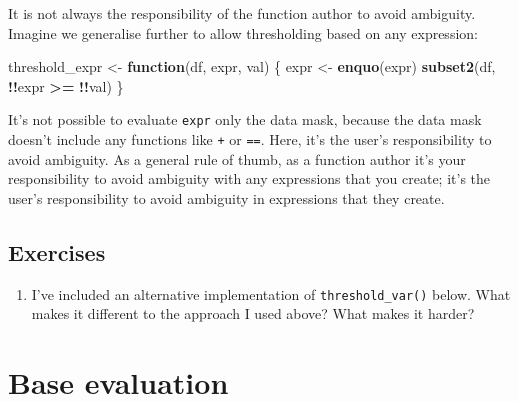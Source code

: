 \documentclass[]{book}
\newenvironment{Shaded}{\begin{snugshade}}{\end{snugshade}}
\newcommand{\ControlFlowTok}[1]{\textcolor[rgb]{0.27,0.27,0.27}{\textbf{#1}}}
\newcommand{\DataTypeTok}[1]{\textcolor[rgb]{0.27,0.27,0.27}{#1}}
\newcommand{\KeywordTok}[1]{\textcolor[rgb]{0.27,0.27,0.27}{\textbf{#1}}}
\newcommand{\NormalTok}[1]{#1}
\newcommand{\OperatorTok}[1]{\textcolor[rgb]{0.43,0.43,0.43}{\textbf{#1}}}
\newcommand{\StringTok}[1]{\textcolor[rgb]{0.5,0.5,0.5}{#1}}
\begin{document}
It is not always the responsibility of the function author to avoid ambiguity. Imagine we generalise further to allow thresholding based on any expression:

\begin{Shaded}
\begin{Highlighting}[]
\NormalTok{threshold_expr <-}\StringTok{ }\ControlFlowTok{function}\NormalTok{(df, expr, val) \{}
\NormalTok{  expr <-}\StringTok{ }\KeywordTok{enquo}\NormalTok{(expr)}
  \KeywordTok{subset2}\NormalTok{(df, }\OperatorTok{!!}\NormalTok{expr }\OperatorTok{>=}\StringTok{ }\OperatorTok{!!}\NormalTok{val)}
\NormalTok{\}}
\end{Highlighting}
\end{Shaded}

It's not possible to evaluate \texttt{expr} only the data mask, because the data mask doesn't include any functions like \texttt{+} or \texttt{==}. Here, it's the user's responsibility to avoid ambiguity. As a general rule of thumb, as a function author it's your responsibility to avoid ambiguity with any expressions that you create; it's the user's responsibility to avoid ambiguity in expressions that they create.

\hypertarget{exercises-12}{%
\subsection{Exercises}\label{exercises-12}}

\begin{enumerate}
\def\labelenumi{\arabic{enumi}.}
\item
  I've included an alternative implementation of \texttt{threshold\_var()} below.
  What makes it different to the approach I used above? What makes it harder?

\begin{Shaded}
\end{Shaded}
\end{enumerate}

\hypertarget{base-evaluation}{%
\section{Base evaluation}\label{base-evaluation}}
\end{document}
